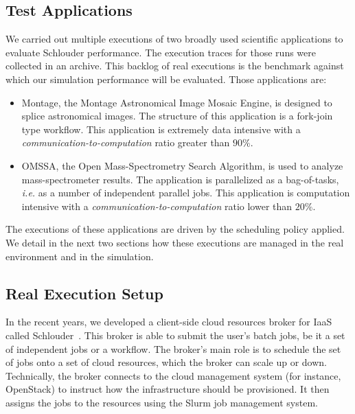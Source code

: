 \documentclass[10pt,conference,compsocconf]{IEEEtran}
\begin{document}
\subsection{Test Applications}\label{sc:setup}

We  carried out  multiple executions  of two broadly used scientific  applications
to  evaluate Schlouder  performance. The execution traces for  those runs were
collected  in an  archive.  This backlog  of real  executions  is the  benchmark
against which  our simulation  performance will  be evaluated.  Those applications
are:

\begin{itemize}
\item Montage\cite{montage2009},  the Montage Astronomical Image  Mosaic Engine,
  is designed to  splice astronomical images. The structure  of this application
  is a  fork-join type  workflow. This application  is extremely  data intensive
  with a \emph{communication-to-computation} ratio greater than $90\%$.

\item OMSSA\cite{Geer2004}, the Open Mass-Spectrometry Search Algorithm, is used
  to analyze  mass-spectrometer results.  The application  is parallelized  as a
  bag-of-tasks, \textit{i.e.}  as a  number of  independent parallel  jobs. This
  application        is        computation        intensive        with        a
  \emph{communication-to-computation} ratio lower than $20\%$.
\end{itemize}

The executions of these applications are driven
by the scheduling policy applied. We detail in the next two sections how these
executions are managed in the real environment and in the simulation.  

\subsection{Real Execution Setup}

In the recent years, we developed  a client-side cloud resources broker for IaaS
called  Schlouder~\cite{Michon17}.  This  broker is  able to  submit the  user's
batch jobs, be  it a set of  independent jobs or a workflow.   The broker's main
role is  to schedule the set  of jobs onto a  set of cloud resources,  which the
broker can scale up  or down.
Technically, the broker  connects to the cloud management  system (for instance,
OpenStack) to  instruct how  the infrastructure should  be provisioned. It then
assigns the jobs to the resources using the Slurm job management system.
\end{document}
